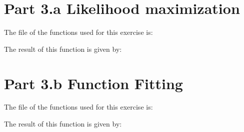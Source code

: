 \section{Part 3.a Likelihood maximization}

The file of the functions used for this exercise is:



The result of this function is given by:



\section{Part 3.b Function Fitting}

The file of the functions used for this exercise is:



The result of this function is given by:

